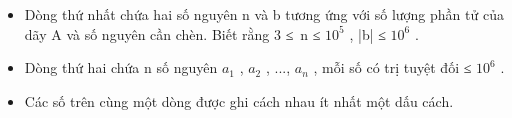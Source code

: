 \begin{itemize}
	\item     Dòng thứ nhất chứa hai số nguyên n và b tương ứng với số lượng phần tử của dãy A và số nguyên cần chèn. Biết rằng 3 ≤ n ≤ $10^{5}$    , |b| ≤ $10^{6}$    .   
	\item     Dòng thứ hai chứa n số nguyên $a_{1}$    , $a_{2}$    , ..., $a_{n}$    , mỗi số có trị tuyệt đối ≤ $10^{6}$    .   
	\item     Các số trên cùng một dòng được ghi cách nhau ít nhất một dấu cách.   
\end{itemize}